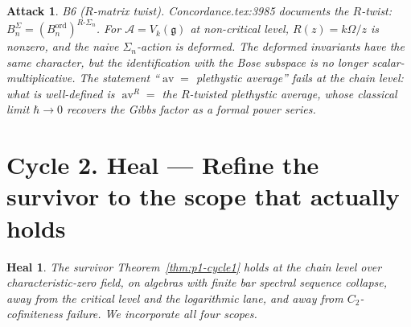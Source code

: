 \documentclass[11pt]{article}
\newtheorem*{attack}{Attack}
\newtheorem*{heal}{Heal}
\theoremstyle{definition}
\DeclareMathOperator{\av}{av}
\newcommand{\ord}{\mathrm{ord}}
\begin{document}
\begin{attack}
\emph{B6 ($R$-matrix twist).} Concordance.tex:3985 documents the
$R$-twist: $B^{\Sigma}_n = (B^{\ord}_n)^{R\text{-}\Sigma_n}$. For
$\mathcal A = V_k(\mathfrak g)$ at non-critical level, $R(z) = k\Omega/z$
is nonzero, and the naive $\Sigma_n$-action is deformed. The deformed
invariants have the same character, but the identification with the
Bose subspace is no longer scalar-multiplicative. The statement
``$\av = $ plethystic average'' fails at the chain level: what is
well-defined is $\av^R = $ the $R$-twisted plethystic average, whose
classical limit $\hbar \to 0$ recovers the Gibbs factor as a formal
power series.
\end{attack}

\section*{Cycle 2. Heal --- Refine the survivor to the scope that actually holds}

\begin{heal}
The survivor Theorem~\ref{thm:p1-cycle1} holds at the chain level
over characteristic-zero field, on algebras with finite bar spectral
sequence collapse, away from the critical level and the logarithmic
lane, and away from $C_2$-cofiniteness failure. We incorporate all four
scopes.
\end{heal}
\end{document}
